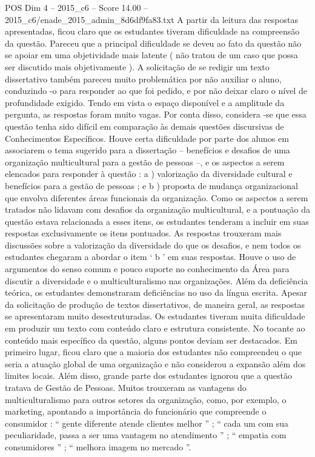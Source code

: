 \begin{textsample}{POS Dim 4 – 2015\_c6 – Score 14.00 – 2015\_c6/enade\_2015\_admin\_8d6df9fa83.txt}
A partir da leitura das respostas apresentadas, ficou claro que os estudantes tiveram dificuldade na compreensão da questão.
Pareceu que a principal dificuldade se deveu ao fato da questão não se apoiar em uma objetividade mais latente ( não tratou de um caso que possa ser discutido mais objetivamente ).
A solicitação de se redigir um texto dissertativo também pareceu muito problemática por não auxiliar o aluno, conduzindo -o para responder ao que foi pedido, e por não deixar claro o nível de profundidade exigido.
Tendo em vista o espaço disponível e a amplitude da pergunta, as respostas foram muito vagas.
Por conta disso, considera -se que essa questão tenha sido difícil em comparação às demais questões discursivas de Conhecimentos Específicos.
Houve certa dificuldade por parte dos alunos em associarem o tema sugerido para a dissertação – benefícios e desafios de uma organização multicultural para a gestão de pessoas –, e os aspectos a serem elencados para responder à questão : a ) valorização da diversidade cultural e benefícios para a gestão de pessoas ; e b ) proposta de mudança organizacional que envolva diferentes áreas funcionais da organização.
Como os aspectos a serem tratados não lidavam com desafios da organização multicultural, e a pontuação da questão estava relacionada a esses itens, os estudantes tenderam a incluir em suas respostas exclusivamente os itens pontuados.
As respostas trouxeram mais discussões sobre a valorização da diversidade do que os desafios, e nem todos os estudantes chegaram a abordar o item ‘ b ’ em suas respostas.
Houve o uso de argumentos do senso comum e pouco suporte no conhecimento da Área para discutir a diversidade e o multiculturalismo nas organizações.
Além da deficiência teórica, os estudantes demonstraram deficiências no uso da língua escrita.
Apesar da solicitação de produção de textos dissertativos, de maneira geral, as respostas se apresentaram muito desestruturadas.
Os estudantes tiveram muita dificuldade em produzir um texto com conteúdo claro e estrutura consistente.
No tocante ao conteúdo mais específico da questão, alguns pontos deviam ser destacados.
Em primeiro lugar, ficou claro que a maioria dos estudantes não compreendeu o que seria a atuação global de uma organização e não considerou a expansão além dos limites locais.
Além disso, grande parte dos estudantes ignorou que a questão tratava de Gestão de Pessoas.
Muitos trouxeram as vantagens do multiculturalismo para outros setores da organização, como, por exemplo, o marketing, apontando a importância do funcionário que compreende o consumidor : “ gente diferente atende clientes melhor ” ; “ cada um com sua peculiaridade, passa a ser uma vantagem no atendimento ” ; “ empatia com consumidores ” ; “ melhora imagem no mercado ”.

\end{textsample}
